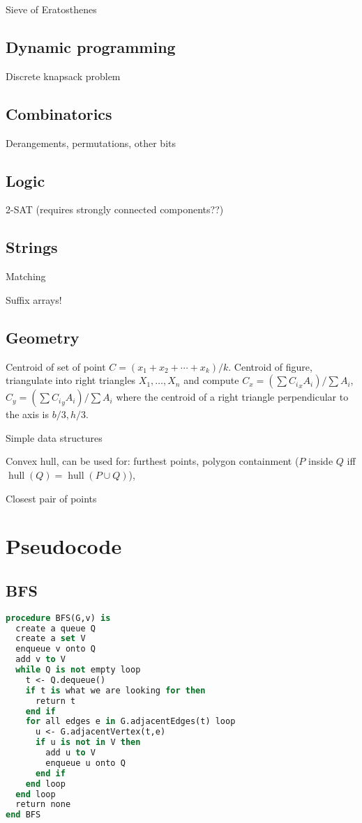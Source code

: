 \documentclass[10pt,a4paper]{article}
\newcommand{\codelisting}[1]{
  }
\begin{document}
Sieve of Eratosthenes
\codelisting{seive.java}

\subsection*{Dynamic programming}
Discrete knapsack problem
\codelisting{knapsack.java}

\subsection*{Combinatorics}
Derangements, permutations, other bits

\subsection*{Logic}
2-SAT (requires strongly connected components??)
\codelisting{2sat.java}

\subsection*{Strings}
Matching
\codelisting{kmp.java}


Suffix arrays!
\codelisting{suffix.java}

\subsection*{Geometry}
Centroid of set of point $C = (x_1 + x_2 + \cdots + x_k) / k$.
Centroid of figure, triangulate into right triangles $X_1,\ldots,X_n$ and compute $C_x = (\sum {C_i}_x A_{i})/\sum A_i$, $C_y = (\sum {C_i}_y A_{i})/\sum A_i$ where the centroid of a right triangle perpendicular to the axis is $b/3,h/3$.

Simple data structures
\codelisting{Point.java}

Convex hull, can be used for: furthest points, polygon containment ($P$ inside $Q$ iff $\operatorname{hull}(Q)  = \operatorname{hull}(P\cup Q)$),
\codelisting{convexhull.java}

Closest pair of points
\codelisting{closestpoints.java}

\section*{Pseudocode}
\subsection*{BFS}
\begin{lstlisting}[language=Pascal]
procedure BFS(G,v) is
  create a queue Q
  create a set V
  enqueue v onto Q
  add v to V
  while Q is not empty loop
    t <- Q.dequeue()
    if t is what we are looking for then
      return t
    end if
    for all edges e in G.adjacentEdges(t) loop
      u <- G.adjacentVertex(t,e)
      if u is not in V then
        add u to V
        enqueue u onto Q
      end if
    end loop
  end loop
  return none
end BFS
\end{lstlisting}
\end{document}
